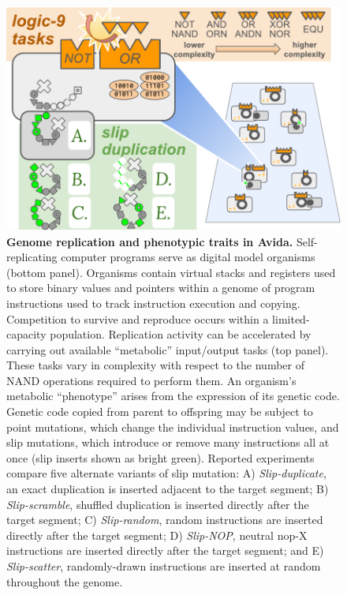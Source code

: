 \begin{figure}[!ht]
\centering
\includegraphics[width=\linewidth]{imgs/GeneDupeOps.pdf}
\vspace{0ex}
\caption{%
\textbf{Genome replication and phenotypic traits in Avida.}
\footnotesize
Self-replicating computer programs serve as digital model organisms (bottom panel).
Organisms contain virtual stacks and registers used to store binary values and pointers within a genome of program instructions used to track instruction execution and copying.
Competition to survive and reproduce occurs within a limited-capacity population.
Replication activity can be accelerated by carrying out available ``metabolic'' input/output tasks (top panel).
These tasks vary in complexity with respect to the number of NAND operations required to perform them.
An organism's metabolic ``phenotype'' arises from the expression of its genetic code.
Genetic code copied from parent to offspring may be subject to point mutations, which change the individual instruction values, and slip mutations, which introduce or remove many instructions all at once (slip inserts shown as bright green).
Reported experiments compare five alternate variants of slip mutation:
A) \textit{Slip-duplicate}, an exact duplication is inserted adjacent to the target segment;
B) \textit{Slip-scramble}, shuffled duplication is inserted directly after the target segment;
C) \textit{Slip-random}, random instructions are inserted directly after the target segment;
D) \textit{Slip-NOP}, neutral nop-X instructions are inserted directly after the target segment; and
E) \textit{Slip-scatter}, randomly-drawn instructions are inserted at random throughout the genome.
}
\label{fig:slip_mut_variants}
\end{figure}
